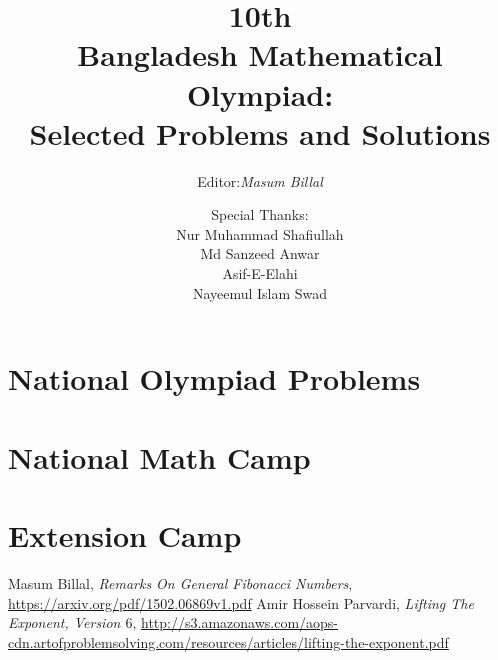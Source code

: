 \documentclass[12pt, oneside,leqno]{book}
\begin{document}
	\frontmatter
	\title{\bf\Huge  10th\\ Bangladesh Mathematical Olympiad:\\Selected Problems and Solutions}
	\author{Editor:\quad\sl Masum Billal\and
		Special Thanks:\\Nur Muhammad Shafiullah\\Md Sanzeed Anwar\\ Asif-E-Elahi\\Nayeemul Islam Swad%
	}
	\date{}
	\maketitle
		
	
	\mainmatter
	
	\newpage
	\chapter{National Olympiad Problems}
		
	\chapter{National Math Camp}
		
	\chapter{Extension Camp}
		
	
	
	
	\begin{thebibliography}{99}
		 Masum Billal, \textsl{Remarks On General Fibonacci Numbers}, \url{https://arxiv.org/pdf/1502.06869v1.pdf}
		 Amir Hossein Parvardi, \textsl{Lifting The Exponent, Version $6$},
			\url{http://s3.amazonaws.com/aops-cdn.artofproblemsolving.com/resources/articles/lifting-the-exponent.pdf}
	\end{thebibliography}
	
\end{document}
